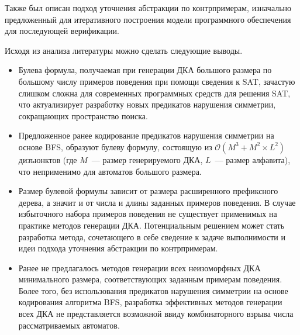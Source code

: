 Также был описан подход уточнения абстракции по контрпримерам, изначально предложенный для итеративного построения модели программного обеспечения для последующей верификации.

Исходя из анализа литературы можно сделать следующие выводы.
\begin{itemize}
  \item Булева формула, получаемая при генерации ДКА большого размера по большому числу примеров поведения при помощи сведения к SAT, зачастую слишком сложна для современных программных средств для решения SAT, что актуализирует разработку новых предикатов нарушения симметрии, сокращающих пространство поиска.
  
  \item Предложенное ранее кодирование предикатов нарушения симметрии на основе BFS, образуют булеву формулу, состоящую из $\mathcal{O}\left(M^{3} + M^{2} \times L^{2}\right)$ дизъюнктов (где $M$~--- размер генерируемого ДКА, $L$~--- размер алфавита), что неприменимо для автоматов большого размера.
  
  \item Размер булевой формулы зависит от размера расширенного префиксного дерева, а значит и от числа и длины заданных примеров поведения.
  В случае избыточного набора примеров поведения не существует применимых на практике методов генерации ДКА.
  Потенциальным решением может стать разработка метода, сочетающего в себе сведение к задаче выполнимости и идеи подхода уточнения абстракции по контрпримерам.

  \item Ранее не предлагалось методов генерации всех неизоморфных ДКА минимального размера, соответствующих заданным примерам поведения.
  Более того, без использования предикатов нарушения симметрии на основе кодирования алгоритма BFS, разработка эффективных методов генерации всех ДКА не представляется возможной ввиду комбинаторного взрыва числа рассматриваемых автоматов.
\end{itemize}